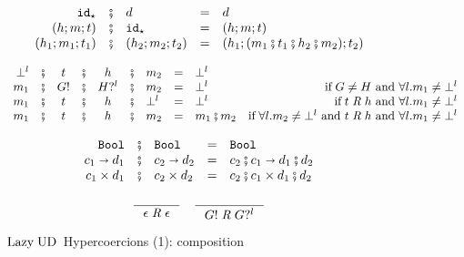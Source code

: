 \documentclass[runningheads]{llncs}
\newcommand{\infr}[2]{\inference{#1}{#2}}
\newcommand{\sidecond}[1]{\text{if}\;#1}
\newcommand{\LUD}{\ensuremath{\text{Lazy\;UD}}}
\newcommand{\Tdyn}[0]{\ensuremath{\star}}
\newcommand{\Pbool}[0]{\ensuremath{\mathtt{Bool}}}
\newcommand{\Pfunc}[2]{\ensuremath{#1 \shortrightarrow #2}}
\newcommand{\Pprod}[2]{\ensuremath{#1 \times #2}}
\newcommand{\cnfid}[1]{\ensuremath{\mathtt{id}_{#1}}}
\newcommand{\hcci}[0]{\cnfid{\Tdyn}}
\newcommand{\hccc}[3]{\ensuremath{(#1;#2;#3)}}
\newcommand{\hche}[0]{\ensuremath{\epsilon}}
\newcommand{\hchp}[2]{\ensuremath{#1?^{#2}}}
\newcommand{\hcmbool}[0]{\Pbool}
\newcommand{\hcmfunc}[2]{\Pfunc{#1}{#2}}
\newcommand{\hcmprod}[2]{\Pprod{#1}{#2}}
\newcommand{\hcmfail}[1]{\ensuremath{\bot^l}}
\newcommand{\hcte}[0]{\ensuremath{\epsilon}}
\newcommand{\hcti}[1]{\ensuremath{#1!}}
\newcommand{\compatibletailhead}[2]{\ensuremath{#1\;\mathit{R}\;#2}}
\begin{document}
\begin{figure}
	\[
	\begin{array}{rclcl}
		\hcci          
		& \fatsemi & d
		& = & d \\
		\hccc{h}{m}{t}
		& \fatsemi & \hcci
		& = & \hccc{h}{m}{t} \\
		\hccc{h_1}{m_1}{t_1}
		& \fatsemi & \hccc{h_2}{m_2}{t_2}
		& = & \hccc{h_1}{(m_1 \fatsemi t_1 \fatsemi h_2 \fatsemi m_2)}{t_2}
	\end{array}
	\]

	\[
	\begin{array}{rccccclclr}
	\hcmfail{l} 
	& \fatsemi & t
	& \fatsemi & h
	& \fatsemi & m_2
	& = & \hcmfail{l} \\
	m_1
	& \fatsemi & \hcti{G}
	& \fatsemi & \hchp{H}{l}
	& \fatsemi & m_2
	& = & \hcmfail{l}
	& \sidecond{G \neq H \text{ and } \forall l. m_1 \neq \hcmfail{l}} \\
	m_1
	& \fatsemi & t
	& \fatsemi & h
	& \fatsemi & \hcmfail{l}
	& = & \hcmfail{l}
	& \sidecond{\compatibletailhead{t}{h}
		\text{ and } \forall l. m_1 \neq \hcmfail{l}} \\
	m_1
	& \fatsemi & t
	& \fatsemi & h
	& \fatsemi & m_2
	& = & m_1 \fatsemi m_2
	& \sidecond{
		\forall l. m_2 \neq \hcmfail{l}
		\text{ and } \compatibletailhead{t}{h}
		\text{ and } \forall l. m_1 \neq \hcmfail{l}} \\
	\end{array}
	\]
	
	\[
	\begin{array}{rclcl}
	\hcmbool
	& \fatsemi & \hcmbool
	& = & \hcmbool \\
	\hcmfunc{c_1}{d_1}
	& \fatsemi & \hcmfunc{c_2}{d_2}
	& = & \hcmfunc{c_2 \fatsemi c_1}{d_1 \fatsemi d_2} \\
	\hcmprod{c_1}{d_1}
	& \fatsemi & \hcmprod{c_2}{d_2}
	& = & \hcmprod{c_2 \fatsemi c_1}{d_1 \fatsemi d_2} \\
	\end{array}
	\]
	
	\fbox{\compatibletailhead{t}{h}}
	\begin{gather*}
	\infr{}{\compatibletailhead{\hcte}{\hche}}
	\quad
	\infr{}{\compatibletailhead{\hcti{G}}{\hchp{G}{l}}}
	\end{gather*}
	
\caption{\LUD\ Hypercoercions (1): composition}
\label{fig:LazyUD-Hypercoercions-composition}
\end{figure}
\end{document}
